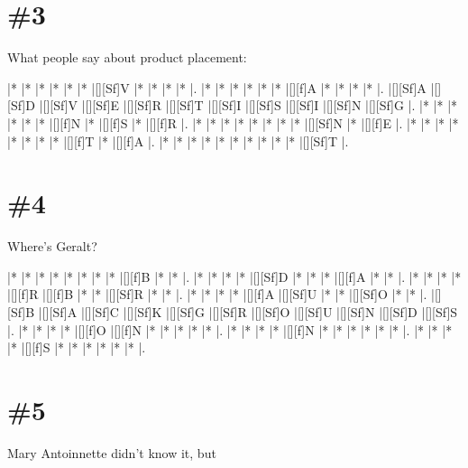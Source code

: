 \documentclass[letterpaper]{article}
\begin{document}
\section*{\#3}
What people say about product placement:
\vspace*{1em}
\begin{Puzzle}{11}{7}
|*        |*        |*        |*        |*        |*        |[][Sf]V  |*        |*        |*        |*        |.
|*        |*        |*        |*        |*        |*        |[][f]A   |*        |*        |*        |*        |.  
|[][Sf]A  |[][Sf]D  |[][Sf]V  |[][Sf]E  |[][Sf]R  |[][Sf]T  |[][Sf]I  |[][Sf]S  |[][Sf]I  |[][Sf]N  |[][Sf]G  |.
|*        |*        |*        |*        |*        |*        |[][f]N   |*        |[][f]S   |*        |[][f]R   |. 
|*        |*        |*        |*        |*        |*        |*        |*        |[][Sf]N  |*        |[][f]E   |.
|*        |*        |*        |*        |*        |*        |*        |*        |[][f]T   |*        |[][f]A   |.
|*        |*        |*        |*        |*        |*        |*        |*        |*        |*        |[][Sf]T  |.
\end{Puzzle}


\section*{\#4}
Where's Geralt?
\vspace*{1em}
\begin{Puzzle}{11}{8}
|*        |*        |*        |*        |*        |*        |*        |*        |[][f]B   |*        |*        |. 
|*        |*        |*        |*        |[][Sf]D  |*        |*        |*        |[][f]A   |*        |*        |.  
|*        |*        |*        |*        |[][f]R   |[][f]B   |*        |*        |[][Sf]R  |*        |*        |.
|*        |*        |*        |*        |[][f]A   |[][Sf]U  |*        |*        |[][Sf]O  |*        |*        |.  
|[][Sf]B  |[][Sf]A  |[][Sf]C  |[][Sf]K  |[][Sf]G  |[][Sf]R  |[][Sf]O  |[][Sf]U  |[][Sf]N  |[][Sf]D  |[][Sf]S  |.
|*        |*        |*        |*        |[][f]O   |[][f]N   |*        |*        |*        |*        |*        |. 
|*        |*        |*        |*        |[][f]N   |*        |*        |*        |*        |*        |*        |.
|*        |*        |*        |*        |[][f]S   |*        |*        |*        |*        |*        |*        |.
\end{Puzzle}

\section*{\#5}
Mary Antoinnette didn't know it, but
\end{document}
